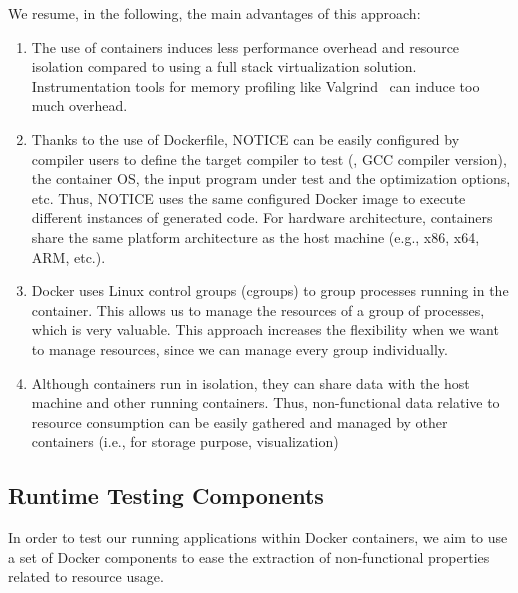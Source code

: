 We resume, in the following, the main advantages of this approach:
\begin{enumerate}
	\item The use of containers induces less performance overhead and resource isolation compared to using a full stack virtualization solution. Instrumentation tools for memory profiling like Valgrind~\cite{nethercote2007valgrind} can induce too much overhead.
	\item Thanks to the use of Dockerfile, NOTICE can be easily configured by compiler users to define the target compiler to test (\eg, GCC compiler version), the container OS, the input program under test and the optimization options, etc. Thus, NOTICE uses the same configured Docker image to execute different instances of generated code. For hardware architecture, containers share the same platform architecture as the host machine (e.g., x86, x64, ARM, etc.). 
	\item Docker uses Linux control groups (cgroups) to group processes running in the container. This allows us to manage the resources of a group of processes, which is very valuable. 
	This approach increases the flexibility when we want to manage resources, since we can manage every group individually. 
	\item Although containers run in isolation, they can share data with the host machine and other running containers. Thus, non-functional data relative to resource consumption can be easily gathered and managed by other containers (i.e., for storage purpose, visualization)
\end{enumerate}


\subsection{Runtime Testing Components}
In order to test our running applications within Docker containers, we aim to use a set of Docker components to ease the extraction of non-functional properties related to resource usage.
